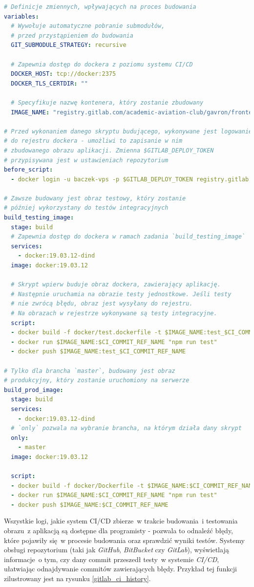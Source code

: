 \begin{lstlisting}[language=yml, label=list:ci_cd_frontend,caption={Plik konfiguracyjny \textit{Gitlab CI}, budujący aplikację kliencką }, basicstyle=\footnotesize\ttfamily]
# Definicje zmiennych, wpływających na proces budowania
variables:
  # Wywołuje automatyczne pobranie submodułów,
  # przed przystąpieniem do budowania 
  GIT_SUBMODULE_STRATEGY: recursive
 
  # Zapewnia dostęp do dockera z poziomu systemu CI/CD
  DOCKER_HOST: tcp://docker:2375
  DOCKER_TLS_CERTDIR: "" 

  # Specyfikuje nazwę kontenera, który zostanie zbudowany 
  IMAGE_NAME: "registry.gitlab.com/academic-aviation-club/gavron/frontend"

# Przed wykonaniem danego skryptu budującego, wykonywane jest logowanie
# do rejestru dockera - umożliwi to zapisanie w nim 
# zbudowanego obrazu aplikacji. Zmienna $GITLAB_DEPLOY_TOKEN
# przypisywana jest w ustawieniach repozytorium
before_script:
  - docker login -u baczek-vps -p $GITLAB_DEPLOY_TOKEN registry.gitlab.com

# Zawsze budowany jest obraz testowy, który zostanie
# później wykorzystany do testów integracyjnych
build_testing_image:
  stage: build
  # Zapewnia dostęp do dockera w ramach zadania `build_testing_image`
  services:
    - docker:19.03.12-dind
  image: docker:19.03.12
  
  # Skrypt wpierw buduje obraz dockera, zawierający aplikację.
  # Następnie uruchamia na obrazie testy jednostkowe. Jeśli testy
  # nie zwrócą błędu, obraz jest wysyłany do rejestru.
  # Na obrazach w rejestrze wykonywane są testy integracyjne.
  script:
  - docker build -f docker/test.dockerfile -t $IMAGE_NAME:test_$CI_COMMIT_REF_NAME .
  - docker run $IMAGE_NAME:$CI_COMMIT_REF_NAME "npm run test"
  - docker push $IMAGE_NAME:test_$CI_COMMIT_REF_NAME

# Tylko dla brancha `master`, budowany jest obraz 
# produkcyjny, który zostanie uruchomiony na serwerze
build_prod_image:
  stage: build
  services:
	- docker:19.03.12-dind	
  # `only` pozwala na wybranie brancha, na którym działa dany skrypt
  only:
    - master
  image: docker:19.03.12
   
  script:
  - docker build -f docker/Dockerfile -t $IMAGE_NAME:$CI_COMMIT_REF_NAME .
  - docker run $IMAGE_NAME:$CI_COMMIT_REF_NAME "npm run test"
  - docker push $IMAGE_NAME:$CI_COMMIT_REF_NAME
\end{lstlisting}

Wszystkie logi, jakie system CI/CD zbierze~w trakcie budowania~i testowania obrazu~z aplikacją są
dostępne dla programisty - pozwala to odnaleźć błędy, które pojawiły się~w procesie budowania oraz
sprawdzić wyniki testów. Systemy obsługi repozytorium (taki jak \textit{GitHub}, \textit{BitBucket}
czy \textit{GitLab}), wyświetlają informacje~o tym, czy dany commit przeszedł testy~w systemie
\textit{CI/CD}, ułatwiając odnajdywanie commitów zawierających błędy. Przykład tej funkcji
zilustrowany jest na rysunku \ref{gitlab_ci_history}.

